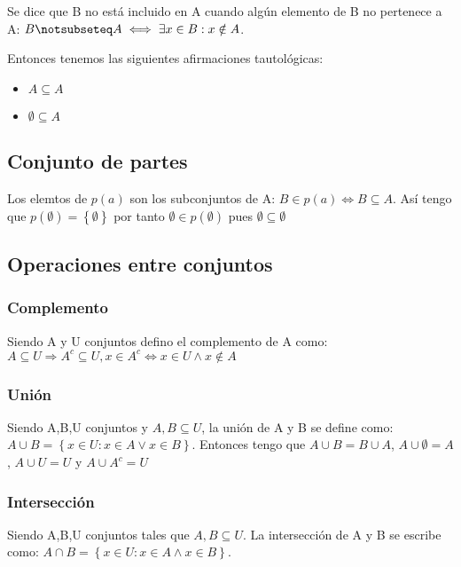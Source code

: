 \documentclass{article}
\begin{document}
Se dice que B no está incluido en A cuando algún elemento de B no pertenece a A: \begin{math}
    B \notsubseteq A \iff \exists x \in B: x \notin A
\end{math}.

Entonces tenemos las siguientes afirmaciones tautológicas: \begin{itemize}
    \item \(A \subseteq A\) 
    \item \(\emptyset \subseteq A\)
\end{itemize}
\subsection{Conjunto de partes}
Los elemtos de $p(a)$ son los subconjuntos de A: \begin{math}
    B \in p(a) \iff B \subseteq A
\end{math}. Así tengo que 
    $p(\emptyset) = \left\{\emptyset \right\}$ por tanto $\emptyset \in p(\emptyset)$ pues $\emptyset \subseteq \emptyset$

\subsection{Operaciones entre conjuntos}
\subsubsection{Complemento}
Siendo A y U conjuntos defino el complemento de A como:
\begin{math}
    A \subseteq U \Rightarrow A^c \subseteq U, x \in A^c \iff x \in U \land x \notin A
\end{math}
\subsubsection{Unión}
Siendo A,B,U conjuntos y $A,B\subseteq U$, la unión de A y B se define como: \begin{math}
    A\cup B = \left\{x\in U: x\in A \lor x\in B\right\}
\end{math}. Entonces tengo que $A\cup B = B \cup A$, $A \cup \emptyset = A$, $A \cup U = U$ y $A \cup A^c = U$
\subsubsection{Intersección}
Siendo A,B,U conjuntos tales que $A,B \subseteq U$. La intersección de A y B se escribe como: \begin{math}
    A \cap B = \left\{x\in U: x \in A \land x \in B\right\}
\end{math}. 
\end{document}
